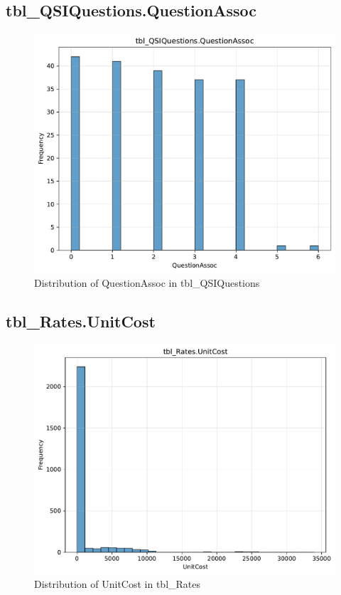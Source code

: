 \subsection{tbl\_QSIQuestions.QuestionAssoc}

\begin{figure}[htbp]
\centering
\includegraphics[width=\textwidth]{figures/dbo_tbl_QSIQuestions_QuestionAssoc.pdf}
\caption{Distribution of QuestionAssoc in tbl\_QSIQuestions}
\end{figure}\newpage

\subsection{tbl\_Rates.UnitCost}

\begin{figure}[htbp]
\centering
\includegraphics[width=\textwidth]{figures/dbo_tbl_Rates_UnitCost.pdf}
\caption{Distribution of UnitCost in tbl\_Rates}
\end{figure}\newpage

